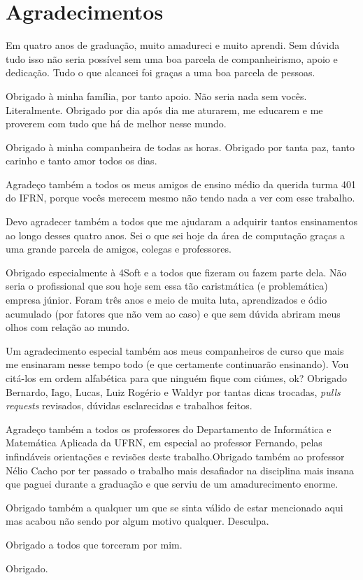 
\chapter*{Agradecimentos}

Em quatro anos de graduação, muito amadureci e muito aprendi. Sem dúvida tudo isso não seria possível sem uma boa parcela de companheirismo, apoio e dedicação. Tudo o que alcancei foi graças a uma boa parcela de pessoas.

Obrigado à minha família, por tanto apoio. Não seria nada sem vocês. Literalmente. Obrigado por dia após dia me aturarem, me educarem e me proverem com tudo que há de melhor nesse mundo.

Obrigado à minha companheira de todas as horas. Obrigado por tanta paz, tanto carinho e tanto amor todos os dias.

Agradeço também a todos os meus amigos de ensino médio da querida turma 401 do IFRN, porque vocês merecem mesmo não tendo nada a ver com esse trabalho.

Devo agradecer também a todos que me ajudaram a adquirir tantos ensinamentos ao longo desses quatro anos. Sei o que sei hoje da área de computação graças a uma grande parcela de amigos, colegas e professores.

Obrigado especialmente à 4Soft e a todos que fizeram ou fazem parte dela. Não seria o profissional que sou hoje sem essa tão caristmática (e problemática) empresa júnior. Foram três anos e meio de muita luta, aprendizados e ódio acumulado (por fatores que não vem ao caso) e que sem dúvida abriram meus olhos com relação ao mundo.

Um agradecimento especial também aos meus companheiros de curso que mais me ensinaram nesse tempo todo (e que certamente continuarão ensinando). Vou citá-los em ordem alfabética para que ninguém fique com ciúmes, ok? Obrigado Bernardo, Iago, Lucas, Luiz Rogério e Waldyr por tantas dicas trocadas, \textit{pulls requests} revisados, dúvidas esclarecidas e trabalhos feitos.

Agradeço também a todos os professores do Departamento de Informática e Matemática Aplicada da UFRN, em especial ao professor Fernando, pelas infindáveis orientações e revisões deste trabalho.Obrigado também ao professor Nélio Cacho por ter passado o trabalho mais desafiador na disciplina mais insana que paguei durante a graduação e que serviu de um amadurecimento enorme.

Obrigado também a qualquer um que se sinta válido de estar mencionado aqui mas acabou não sendo por algum motivo qualquer. Desculpa.

Obrigado a todos que torceram por mim.

Obrigado.
